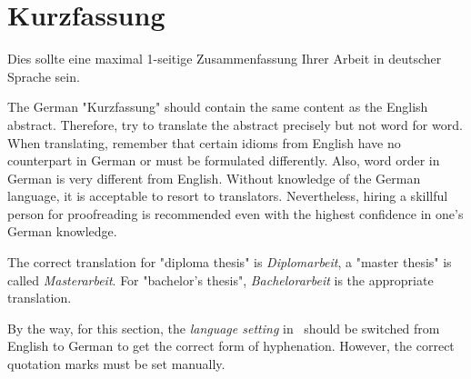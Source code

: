 \chapter{Kurzfassung}

\begin{german} %
	Dies sollte eine maximal 1-seitige Zusammenfassung Ihrer Arbeit in deutscher
	Sprache sein.
\end{german}

The German "Kurzfassung" should contain the same content as the English abstract.
Therefore, try to translate the abstract precisely but not word for word. When
translating, remember that certain idioms from English have no counterpart in
German or must be formulated differently. Also, word order in German is very
different from English. Without
knowledge of the German language, it is acceptable to resort to translators.
Nevertheless, hiring a skillful person for proofreading is recommended
even with the highest confidence in one's German knowledge.

The correct translation for "diploma thesis" is \emph{Diplomarbeit}, a "master
thesis" is called \emph{Masterarbeit}. For "bachelor's thesis",
\emph{Bachelorarbeit} is the appropriate translation.

By the way, for this section, the \emph{language setting} in \latex\ should be
switched from English to German to get the correct form of hyphenation. However,
the correct quotation marks must be set manually.
